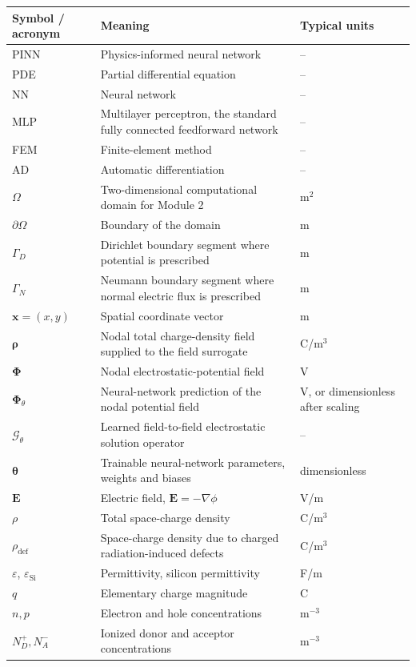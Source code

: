 \documentclass[11pt]{article}
\newcommand{\thetav}{\bm{\theta}}
\newcommand{\xv}{\bm{x}}
\newcommand{\Evec}{\mathbf{E}}
\newcommand{\rhodef}{\rho_{\mathrm{def}}}
\newcommand{\epss}{\varepsilon_{\mathrm{Si}}}
\newcommand{\Om}{\Omega}
\begin{document}
\renewcommand{\arraystretch}{1.25}
\begin{longtable}{p{} p{} p{}}
\toprule
\textbf{Symbol / acronym} & \textbf{Meaning} & \textbf{Typical units} \\
\midrule
\endhead
PINN & Physics-informed neural network & -- \\
PDE & Partial differential equation & -- \\
NN & Neural network & -- \\
MLP & Multilayer perceptron, the standard fully connected feedforward network & -- \\
FEM & Finite-element method & -- \\
AD & Automatic differentiation & -- \\
$\Om$ & Two-dimensional computational domain for Module 2 & m$^2$ \\
$\partial\Om$ & Boundary of the domain & m \\
$\Gamma_D$ & Dirichlet boundary segment where potential is prescribed & m \\
$\Gamma_N$ & Neumann boundary segment where normal electric flux is prescribed & m \\
$\xv=(x,y)$ & Spatial coordinate vector & m \\
$\bm{\rho}$ & Nodal total charge-density field supplied to the field surrogate & C/m$^3$ \\
$\bm{\Phi}$ & Nodal electrostatic-potential field & V \\
$\bm{\Phi}_{\theta}$ & Neural-network prediction of the nodal potential field & V, or dimensionless after scaling \\
$\mathcal{G}_{\theta}$ & Learned field-to-field electrostatic solution operator & -- \\
$\thetav$ & Trainable neural-network parameters, weights and biases & dimensionless \\
$\Evec$ & Electric field, $\Evec=-\nabla \phi$ & V/m \\
$\rho$ & Total space-charge density & C/m$^3$ \\
$\rhodef$ & Space-charge density due to charged radiation-induced defects & C/m$^3$ \\
$\varepsilon$, $\epss$ & Permittivity, silicon permittivity & F/m \\
$q$ & Elementary charge magnitude & C \\
$n,p$ & Electron and hole concentrations & m$^{-3}$ \\
$N_D^+,N_A^-$ & Ionized donor and acceptor concentrations & m$^{-3}$ \\

\end{longtable}
\end{document}
